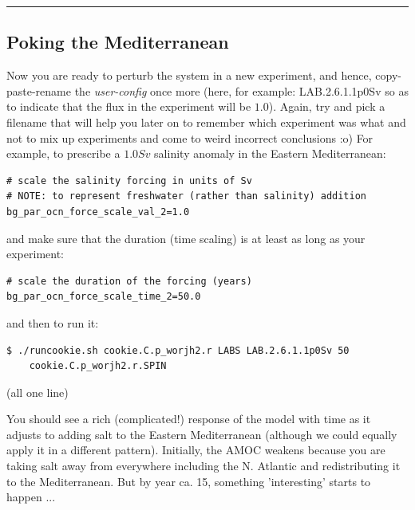 \vspace{1mm}\noindent\rule{4cm}{0.5pt}\vspace{2mm}

\subsection{Poking the Mediterranean}

Now you are ready to perturb the system in a new experiment, and hence, copy-paste-rename the \textit{user-config} once more (here, for example: \textsf{\footnotesize LAB.2.6.1.1p0Sv} so as to indicate that the flux in the experiment will be $1.0$). Again, try and pick a filename that will help you later on to remember which experiment was what and not to mix up experiments and come to weird incorrect conclusions :o) For example, to prescribe a $1.0 Sv$ salinity anomaly in the Eastern Mediterranean:

\vspace{-2mm}\small\begin{verbatim}
# scale the salinity forcing in units of Sv
# NOTE: to represent freshwater (rather than salinity) addition
bg_par_ocn_force_scale_val_2=1.0
\end{verbatim}\normalsize\vspace{-2mm}
and make sure that the duration (time scaling) is at least as long as your experiment:
\vspace{-2mm}\small\begin{verbatim}
# scale the duration of the forcing (years)
bg_par_ocn_force_scale_time_2=50.0
\end{verbatim}\normalsize\vspace{-2mm}
and then to run it:

\vspace{-2mm}\small\begin{verbatim}
$ ./runcookie.sh cookie.C.p_worjh2.r LABS LAB.2.6.1.1p0Sv 50
    cookie.C.p_worjh2.r.SPIN
\end{verbatim}\normalsize\vspace{-2mm}
(all one line)

\vspace{1mm}
You should see a rich (complicated!) response of the model with time as it adjusts to adding salt to the Eastern Mediterranean (although we could equally apply it in a different pattern). Initially, the AMOC weakens because you are taking salt away from everywhere including the N. Atlantic and redistributing it to the Mediterranean. But by year ca. 15, something 'interesting' starts to happen ... 

